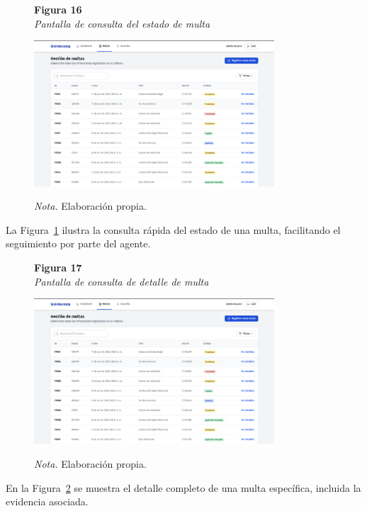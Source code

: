  \begin{figure}[htbp]
    \begin{flushleft}
        \textbf{Figura 16}\\[2em]
        \textit{Pantalla de consulta del estado de multa}
    \end{flushleft}
    \vspace{1em}
    \centering
    \includegraphics[width=0.8\textwidth]{Images/UI4.png}
    \vspace{2em}
    \begin{flushleft}
        \textit{Nota.} Elaboración propia.
    \end{flushleft}
    \label{fig:consulta_estado_multa}
\end{figure}
La Figura~\ref{fig:consulta_estado_multa} ilustra la consulta rápida del estado de una multa, facilitando el seguimiento por parte del agente.
 \begin{figure}[htbp]
    \begin{flushleft}
        \textbf{Figura 17}\\[2em]
        \textit{Pantalla de consulta de detalle de multa}
    \end{flushleft}
    \vspace{1em}
    \centering
    \includegraphics[width=0.8\textwidth]{Images/UI4.png}
    \vspace{2em}
    \begin{flushleft}
        \textit{Nota.} Elaboración propia.
    \end{flushleft}
    \label{fig:consulta_detalle_multa}
\end{figure}
En la Figura~\ref{fig:consulta_detalle_multa} se muestra el detalle completo de una multa específica, incluida la evidencia asociada.
